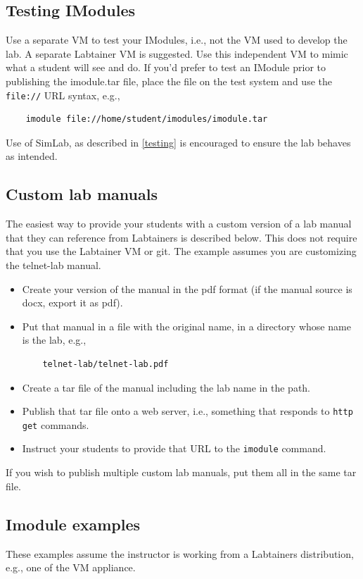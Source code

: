 \documentclass[12pt]{article}
\begin{document}
\subsection{Testing IModules}
Use a separate VM to test your IModules, i.e., not the VM used to develop the lab.  A separate
Labtainer VM is suggested.  Use this independent VM to mimic what a student will see and do.  If
you'd prefer to test an IModule prior to publishing the imodule.tar file, place the file on the
test system and use the {\tt file://} URL syntax, e.g.,
\begin{verbatim}
    imodule file://home/student/imodules/imodule.tar
\end{verbatim} 
\noindent Use of SimLab, as described in \ref{testing} is encouraged to ensure the lab behaves as intended.

\subsection {Custom lab manuals}
The easiest way to provide your students with a custom version of a lab manual that they can reference from Labtainers
is described below.  This does not require that you use the Labtainer VM or git. The example assumes you are customizing
the telnet-lab manual.
\begin{itemize}
\item Create your version of the manual in the pdf format (if the manual source is docx, export it as pdf).
\item Put that manual in a file with the original name, in a directory whose name is the lab, e.g.,
\begin{verbatim}
    telnet-lab/telnet-lab.pdf
\end{verbatim}
\item Create a tar file of the manual including the lab name in the path.
\item Publish that tar file onto a web server, i.e., something that responds to {\tt http get} commands.
\item Instruct your students to provide that URL to the {\tt imodule} command. 
\end{itemize}
If you wish to publish multiple custom lab manuals, put them all in the same tar file.
\subsection {Imodule examples}  
These examples assume the instructor is working from a Labtainers distribution, e.g., one
of the VM appliance.
\end{document}

